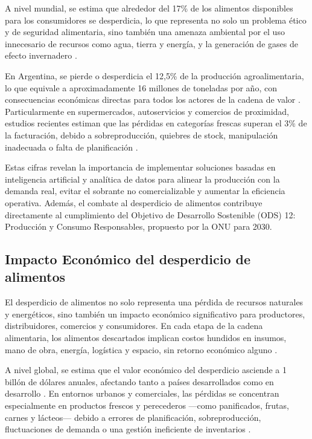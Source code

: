A nivel mundial, se estima que alrededor del 17\% de los alimentos disponibles para los consumidores se desperdicia, lo que representa no solo un problema ético y de seguridad alimentaria, sino también una amenaza ambiental por el uso innecesario de recursos como agua, tierra y energía, y la generación de gases de efecto invernadero \parencite{unep2021}.

En Argentina, se pierde o desperdicia el 12{,}5\% de la producción agroalimentaria, lo que equivale a aproximadamente 16 millones de toneladas por año, con consecuencias económicas directas para todos los actores de la cadena de valor \parencite{tiscornia2022}. Particularmente en supermercados, autoservicios y comercios de proximidad, estudios recientes estiman que las pérdidas en categorías frescas superan el 3\% de la facturación, debido a sobreproducción, quiebres de stock, manipulación inadecuada o falta de planificación \parencite{weteam2021}.

Estas cifras revelan la importancia de implementar soluciones basadas en inteligencia artificial y analítica de datos para alinear la producción con la demanda real, evitar el sobrante no comercializable y aumentar la eficiencia operativa. Además, el combate al desperdicio de alimentos contribuye directamente al cumplimiento del Objetivo de Desarrollo Sostenible (ODS) 12: Producción y Consumo Responsables, propuesto por la ONU para 2030.

\subsection{Impacto Económico del desperdicio de alimentos}

El desperdicio de alimentos no solo representa una pérdida de recursos naturales y energéticos, sino también un impacto económico significativo para productores, distribuidores, comercios y consumidores. En cada etapa de la cadena alimentaria, los alimentos descartados implican costos hundidos en insumos, mano de obra, energía, logística y espacio, sin retorno económico alguno \parencite{gustavsson2011}.

A nivel global, se estima que el valor económico del desperdicio asciende a 1 billón de dólares anuales, afectando tanto a países desarrollados como en desarrollo \parencite{fao2013}. En entornos urbanos y comerciales, las pérdidas se concentran especialmente en productos frescos y perecederos —como panificados, frutas, carnes y lácteos— debido a errores de planificación, sobreproducción, fluctuaciones de demanda o una gestión ineficiente de inventarios \parencite{fao2019}.

